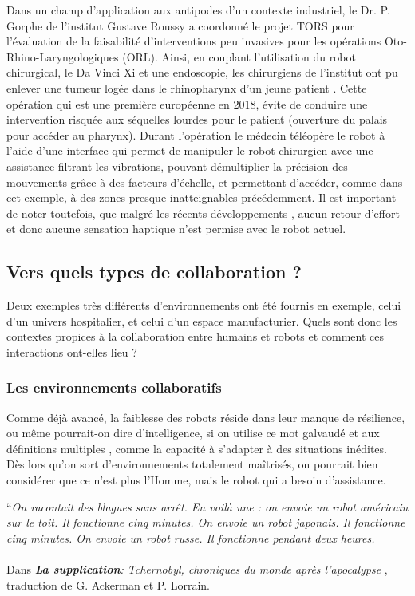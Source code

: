 Dans un champ d'application aux antipodes d'un contexte industriel, le Dr. P. Gorphe de l'institut Gustave Roussy a coordonné le projet TORS pour l'évaluation de la faisabilité d'interventions peu invasives pour les opérations Oto-Rhino-Laryngologiques (ORL). Ainsi, en couplant l'utilisation du robot chirurgical, le Da Vinci Xi et une endoscopie, les chirurgiens de l'institut ont pu enlever une tumeur logée dans le rhinopharynx d’un jeune patient \parencite{parisel_chirurgie_2018}. Cette opération qui est une première européenne en 2018, évite de conduire une intervention risquée aux séquelles lourdes pour le patient (ouverture du palais pour accéder au pharynx). Durant l'opération le médecin téléopère le robot à l'aide d'une interface qui permet de manipuler le robot chirurgien avec une assistance filtrant les vibrations, pouvant démultiplier la précision des mouvements grâce à des facteurs d'échelle, et permettant d'accéder, comme dans cet exemple, à des zones presque inatteignables précédemment. Il est important de noter toutefois, que malgré les récents développements \parencite{abiri_multi-modal_2019}, aucun retour d'effort et donc aucune sensation haptique n'est permise avec le robot actuel.

\subsection{Vers quels types de collaboration ?}

Deux exemples très différents d'environnements ont été fournis en exemple, celui d'un univers hospitalier, et celui d'un espace manufacturier. Quels sont donc les contextes propices à la collaboration entre humains et robots et comment ces interactions ont-elles lieu ?

\subsubsection{Les environnements collaboratifs}

Comme déjà avancé, la faiblesse des robots réside dans leur manque de résilience, ou même pourrait-on dire d'intelligence, si on utilise ce mot galvaudé et aux définitions multiples \parencite{cnrtl_intelligence_2012}, comme la capacité à s'adapter à des situations inédites. Dès lors qu'on sort d'environnements totalement maîtrisés, on pourrait bien considérer que ce n'est plus l'Homme, mais le robot qui a besoin d'assistance. 

\begin{mdframed}[style=quotationStyle]
	{\Huge ``}\textit{On racontait des blagues sans arrêt. En voilà une : on envoie un robot américain sur le toit. Il fonctionne cinq minutes. On envoie un robot japonais. Il fonctionne cinq minutes. On envoie un robot russe. Il fonctionne pendant deux heures.}\\
	\\
	Dans \textit{\textbf{La supplication}: Tchernobyl, chroniques du monde après l'apocalypse} \parencite{alexievitch_supplication_2014}, traduction de G. Ackerman et P. Lorrain.
\end{mdframed}


